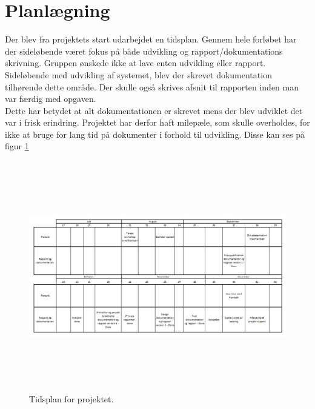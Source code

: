 \section{Planlægning}
Der blev fra projektets start udarbejdet en tidsplan.
Gennem hele forløbet har der sideløbende været fokus på både udvikling og rapport/dokumentations skrivning.
Gruppen ønskede ikke at lave enten udvikling eller rapport. Sideløbende med udvikling af systemet, blev der skrevet dokumentation tilhørende dette område. Der skulle også skrives afsnit til rapporten inden man var færdig med opgaven. \\
Dette har betydet at alt dokumentationen er skrevet mens der blev udviklet det var i frisk erindring.
Projektet har derfor haft milepæle, som skulle overholdes, for ikke at bruge for lang tid på dokumenter i forhold til udvikling. Disse kan ses på figur \ref{fig:Tidsplan}

\begin{figure} [H]
	\begin{center}
		\includegraphics[height=10cm, width=16cm]{Planlaegning/Tidsplan}
	\end{center}
	\caption{Tidsplan for projektet.}
	\label{fig:Tidsplan}
\end{figure}

\clearpage

